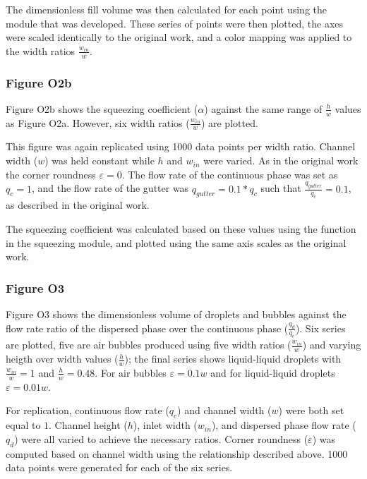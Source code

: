 The dimensionless fill volume was then calculated for each point using the module that was
developed. These series of points were then plotted, the axes were scaled identically to the
original work, and a color mapping was applied to the width ratios $\frac{w_{in}}{w}$.

\subsubsection{Figure O2b}

Figure O2b shows the squeezing coefficient ($\alpha$) against the same range of $\frac{h}{w}$
values as Figure O2a. However, six width ratios ($\frac{w_{in}}{w}$) are plotted.

This figure was again replicated using 1000 data points per width ratio. Channel width ($w$) was
held constant while $h$ and $w_{in}$ were varied. As in the original work the corner roundness
$\varepsilon=0$. The flow rate of the continuous phase was set as $q_c=1$, and the flow rate of the
gutter was $q_{gutter}=0.1*q_c$ such that $\frac{q_{gutter}}{q_c}=0.1$, as described in the original
work.

The squeezing coefficient was calculated based on these values using the function in the
squeezing module, and plotted using the same axis scales as the original work.

\subsubsection{Figure O3}

Figure O3 shows the dimensionless volume of droplets and bubbles against the flow rate ratio
of the dispersed phase over the continuous phase ($\frac{q_d}{q_c}$). Six series are plotted,
five are air bubbles produced using five width ratios ($\frac{w_{in}}{w}$) and varying heigth over width
values ($\frac{h}{w}$); the final series shows liquid-liquid droplets with $\frac{w_{in}}{w} = 1$ and
$\frac{h}{w}=0.48$. For air bubbles $\varepsilon=0.1w$ and for liquid-liquid droplets $\varepsilon=0.01w$.

For replication, continuous flow rate ($q_c$) and channel width ($w$) were both set equal to $1$.
Channel height ($h$), inlet width ($w_{in}$), and dispersed phase flow rate ($q_d$) were all varied to
achieve the necessary ratios. Corner roundness ($\varepsilon$) was computed based on channel width using the
relationship described above. 1000 data points were generated for each of the six series.

